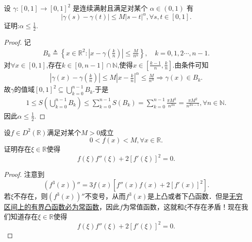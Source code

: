 \documentclass[../../main.tex]{subfiles}%
\begin{document}
\begin{example}
设 $\gamma:[0,1]\to[0,1]^2$ 是连续满射且满足对某个 $\alpha\in(0,1)$ 有
\[
|\gamma(s)-\gamma(t)|\leqslant M|s-t|^\alpha,\forall s,t\in[0,1].
\]
证明:$\alpha\leqslant\frac{1}{2}$.
\end{example}
\begin{proof}
记
\begin{align*}
B_k\triangleq \left\{ x\in \mathbb{R} ^2:\left| x-\gamma \left( \frac{k}{n} \right) \right|\leqslant \frac{M}{n^{\alpha}} \right\},\quad k=0,1,2\cdots,n-1.
\end{align*}
对$\forall x\in \left[ 0,1 \right]$,存在$k\in \left[ 0,n-1 \right] \cap \mathbb{N}$,使得$x\in \left[ \frac{k-1}{n},\frac{k}{n} \right]$.由条件可知
\begin{align*}
\left| \gamma \left( x \right) -\gamma \left( \frac{k}{n} \right) \right|\leqslant M\left| x-\frac{k}{n} \right|^{\alpha}\leqslant \frac{M}{n^{\alpha}}\Longrightarrow \gamma \left( x \right) \in B_k.
\end{align*}
故$\gamma$的值域$\left[ 0,1 \right] ^2\subseteq \bigcup_{k=0}^{n-1}{B_k}$.于是
\begin{align*}
1\leqslant S\left( \bigcup_{k=0}^{n-1}{B_k} \right) \leqslant \sum\limits_{k=0}^{n-1}{S\left( B_k \right)}=\sum\limits_{k=0}^{n-1}{\frac{\pi M^2}{n^{2\alpha}}}=\frac{\pi M^2}{n^{2\alpha -1}},\forall n\in \mathbb{N}.
\end{align*}
因此$\alpha \leqslant \frac{1}{2}$.
\end{proof}

\begin{example}
设$f \in D^2(\mathbb{R})$满足对某个$M > 0$成立
$$0 < f(x) < M, \forall x \in \mathbb{R}.$$
证明存在$\xi \in \mathbb{R}$使得
$$f(\xi)f''(\xi) + 2[f'(\xi)]^2 = 0.$$
\end{example}
\begin{proof}
注意到
$$(f^3(x))'' = 3f(x)\left[f''(x)f(x) + 2[f'(x)]^2\right].$$
若$\xi$不存在，则$(f^3(x))''$不变号，从而$f^3(x)$是上凸或者下凸函数．但是\hyperref[proposition:无穷区间上的有界凸函数必为常函数]{无穷区间上的有界凸函数必为常函数}，因此$f$为常值函数，这就和$\xi$不存在矛盾！现在我们知道存在$\xi \in \mathbb{R}$使得
$$f(\xi)f''(\xi) + 2[f'(\xi)]^2 = 0.$$
\end{proof}
\end{document}
